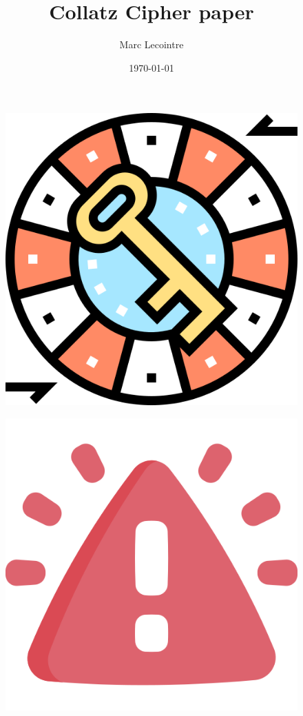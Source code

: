 \documentclass{article}
\begin{document}
\title{\huge{Collatz Cipher paper}}

\author{Marc Lecointre}

\date{\today}

\maketitle

\begin{figure}[H]
    \centering
    \includegraphics[scale=0.225]{logo}
\end{figure}

\begin{figure}[H]
    \centering
    \includegraphics[scale=0.18]{warning}
\end{figure}
\end{document}
